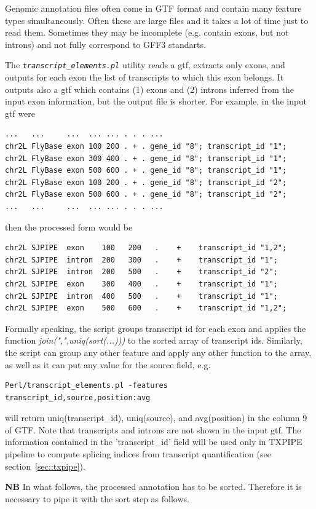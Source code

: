 \documentclass{article}
\newcommand{\prog}[1]{{\tt\em #1}}
\begin{document}
Genomic annotation files often come in GTF format and contain many feature types simultaneously. Often these are large files and it takes a lot of 
time just to read them. Sometimes they may be incomplete (e.g. contain exons, but not introns) and not fully correspond to GFF3 standarts.

The \prog{transcript\_elements.pl} utility reads a gtf, extracts only exons, and outputs for each exon the list of transcripts to which this exon 
belongs. It outputs also a gtf which contains (1) exons and (2) introns inferred from the input exon information, but the output file is shorter.
For example, in the input gtf were
\begin{verbatim} 
...   ...     ...  ... ... . . . ...      
chr2L FlyBase exon 100 200 . + . gene_id "8"; transcript_id "1";
chr2L FlyBase exon 300 400 . + . gene_id "8"; transcript_id "1"; 
chr2L FlyBase exon 500 600 . + . gene_id "8"; transcript_id "1"; 
chr2L FlyBase exon 100 200 . + . gene_id "8"; transcript_id "2"; 
chr2L FlyBase exon 500 600 . + . gene_id "8"; transcript_id "2"; 
...   ...     ...  ... ... . . . ...
\end{verbatim}
then the processed form would be
\begin{verbatim} 
chr2L SJPIPE  exon    100   200   .    +    transcript_id "1,2";
chr2L SJPIPE  intron  200   300   .    +    transcript_id "1";
chr2L SJPIPE  intron  200   500   .    +    transcript_id "2";
chr2L SJPIPE  exon    300   400   .    +    transcript_id "1";
chr2L SJPIPE  intron  400   500   .    +    transcript_id "1";
chr2L SJPIPE  exon    500   600   .    +    transcript_id "1,2";
\end{verbatim}
Formally speaking, the script groups transcript id for each exon and applies the function {\em join(",",uniq(sort(...)))} to the sorted array of transcript ids. Similarly,
the script can group any other feature and apply any other function to the array, as well as it can put any value for the source field, e.g.
\begin{verbatim}
Perl/transcript_elements.pl -features transcript_id,source,position:avg
\end{verbatim}
will return uniq(transcript\_id), uniq(source), and avg(position) in the column 9 of GTF. Note that transcripts and introns are not shown in the input gtf. 
The information contained in the 'transcript\_id' field will be used only in TXPIPE pipeline to compute splicing indices from transcript quantification (see 
section~\ref{sec::txpipe}).

{\bf NB} In what follows, the processed annotation has to be sorted. Therefore it is necessary to pipe it with the sort step as follows.
\end{document}
